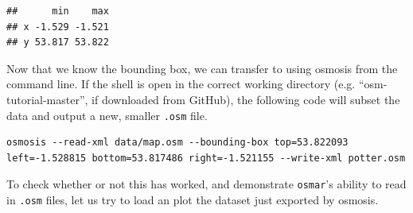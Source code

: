 \documentclass[]{article}
\newenvironment{Shaded}{}{}
\newcommand{\KeywordTok}[1]{\textcolor[rgb]{0.00,0.44,0.13}{\textbf{{#1}}}}
\newcommand{\DecValTok}[1]{\textcolor[rgb]{0.25,0.63,0.44}{{#1}}}
\newcommand{\FloatTok}[1]{\textcolor[rgb]{0.25,0.63,0.44}{{#1}}}
\newcommand{\StringTok}[1]{\textcolor[rgb]{0.25,0.44,0.63}{{#1}}}
\newcommand{\CommentTok}[1]{\textcolor[rgb]{0.38,0.63,0.69}{\textit{{#1}}}}
\newcommand{\NormalTok}[1]{{#1}}
\begin{document}
\begin{Shaded}
\end{Shaded}
\begin{verbatim}
##      min    max
## x -1.529 -1.521
## y 53.817 53.822
\end{verbatim}
Now that we know the bounding box, we can transfer to using osmosis from
the command line. If the shell is open in the correct working directory
(e.g. ``osm-tutorial-master'', if downloaded from GitHub), the following
code will subset the data and output a new, smaller \texttt{.osm} file.

\begin{verbatim}
osmosis --read-xml data/map.osm --bounding-box top=53.822093 left=-1.528815 bottom=53.817486 right=-1.521155 --write-xml potter.osm
\end{verbatim}
To check whether or not this has worked, and demonstrate
\texttt{osmar}'s ability to read in \texttt{.osm} files, let us try to
load an plot the dataset just exported by osmosis.
\end{document}
